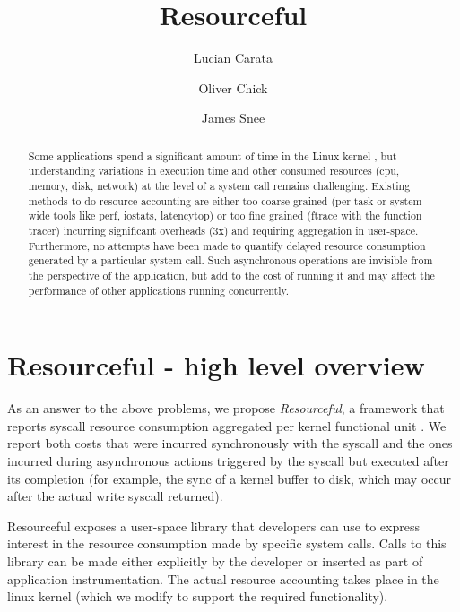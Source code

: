 \documentclass[12pt]{article}
\title{Resourceful}
\author{Lucian Carata \and Oliver Chick \and James Snee}
\date{}
\begin{document}
\maketitle{}

\begin{abstract}
Some applications spend a significant amount of time in the Linux kernel \cite{kernelscale}, but understanding variations in execution time and other consumed resources (cpu, memory, disk, network) at the level of a system call remains challenging.
Existing methods to do resource accounting are either too coarse grained (per-task or system-wide tools like perf, iostats, latencytop) or too fine grained (ftrace with the function tracer) incurring significant overheads (3x) and requiring aggregation in user-space.
Furthermore, no attempts have been made to quantify delayed resource consumption generated by a particular system call. Such asynchronous operations are invisible from the perspective of the application, but add to the cost of running it and may affect the performance of other applications running concurrently.
\end{abstract}

\section{Resourceful - high level overview}
  As an answer to the above problems, we propose \emph{Resourceful}, a framework that reports syscall resource consumption aggregated per kernel functional unit \cite{kernelmap}. We report both costs that were incurred synchronously with the syscall and the ones incurred during asynchronous actions triggered by the syscall but executed after its completion (for example, the sync of a kernel buffer to disk, which may occur after the actual write syscall returned).

Resourceful exposes a user-space library that developers can use to express interest in the resource consumption made by specific system calls. Calls to this library can be made either explicitly by the developer or inserted as part of application instrumentation. The actual resource accounting takes place in the linux kernel (which we modify to support the required functionality).
\end{document}
